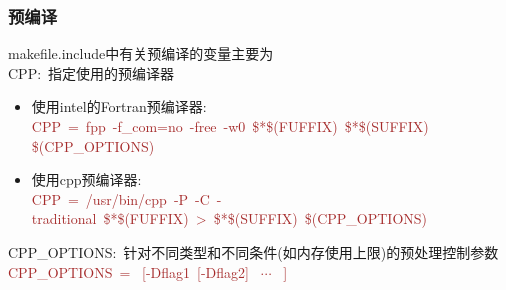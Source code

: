 \subsubsection{\rm{预编译}}
\textrm{makefile.include}中有关预编译的变量主要为\\
\textrm{CPP}:~指定使用的预编译器
\begin{itemize}
	\item 使用\textrm{intel}的\textrm{Fortran}预编译器:\\
		\textcolor{brown}{\textrm{CPP~=~fpp~-f\_com=no~-free~-w0~\$*\$(FUFFIX)~\$*\$(SUFFIX) \$(CPP\_OPTIONS)}}
	\item 使用\textrm{cpp}预编译器:\\
		\textcolor{brown}{\textrm{CPP~=~/usr/bin/cpp~-P~-C~-traditional~\$*\$(FUFFIX)~>~\$*\$(SUFFIX)~\$(CPP\_OPTIONS)}}
\end{itemize}
\textrm{CPP\_OPTIONS}:~针对不同类型和不同条件(如内存使用上限)的预处理控制参数\\
	\textcolor{brown}{\textrm{CPP\_OPTIONS~= ~[-Dflag1~[-Dflag2]~ $\cdots$~ ]}}
